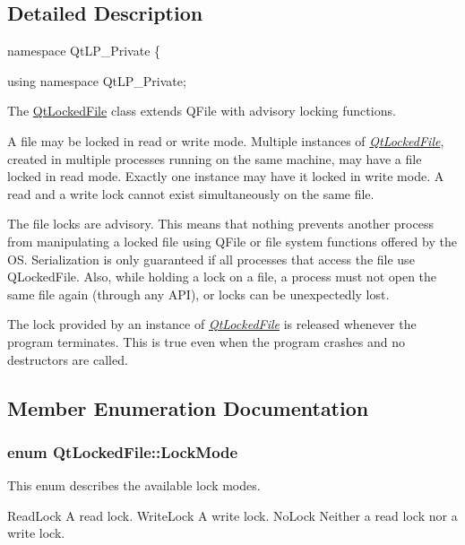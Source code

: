 \subsection{Detailed Description}
namespace QtLP\_\-Private \{ 

using namespace QtLP\_\-Private;

The \hyperlink{class_qt_locked_file}{QtLockedFile} class extends QFile with advisory locking functions.

A file may be locked in read or write mode. Multiple instances of {\itshape \hyperlink{class_qt_locked_file}{QtLockedFile}\/}, created in multiple processes running on the same machine, may have a file locked in read mode. Exactly one instance may have it locked in write mode. A read and a write lock cannot exist simultaneously on the same file.

The file locks are advisory. This means that nothing prevents another process from manipulating a locked file using QFile or file system functions offered by the OS. Serialization is only guaranteed if all processes that access the file use QLockedFile. Also, while holding a lock on a file, a process must not open the same file again (through any API), or locks can be unexpectedly lost.

The lock provided by an instance of {\itshape \hyperlink{class_qt_locked_file}{QtLockedFile}\/} is released whenever the program terminates. This is true even when the program crashes and no destructors are called. 

\subsection{Member Enumeration Documentation}
\hypertarget{class_qt_locked_file_aef385609a0a280b52334b972b04074cc}{
\subsubsection[{LockMode}]{\setlength{\rightskip}{0pt plus 5cm}enum {\bf QtLockedFile::LockMode}}}
\label{class_qt_locked_file_aef385609a0a280b52334b972b04074cc}
This enum describes the available lock modes.

ReadLock A read lock.  WriteLock A write lock.  NoLock Neither a read lock nor a write lock. 

